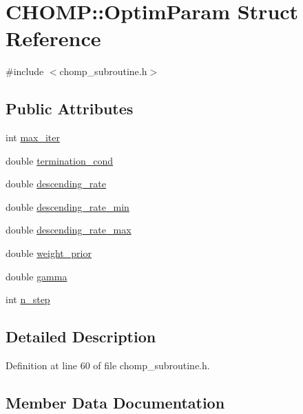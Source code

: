 \hypertarget{struct_c_h_o_m_p_1_1_optim_param}{}\section{C\+H\+O\+MP\+:\+:Optim\+Param Struct Reference}
\label{struct_c_h_o_m_p_1_1_optim_param}


{\ttfamily \#include $<$chomp\+\_\+subroutine.\+h$>$}

\subsection*{Public Attributes}
\begin{DoxyCompactItemize}
\item 
int \hyperlink{struct_c_h_o_m_p_1_1_optim_param_a0ede8f165be67dd3607e47fa90ed9c31}{max\+\_\+iter}
\item 
double \hyperlink{struct_c_h_o_m_p_1_1_optim_param_afb3b23647f1698f1815f4f877ac302ea}{termination\+\_\+cond}
\item 
double \hyperlink{struct_c_h_o_m_p_1_1_optim_param_a24f769bd28ca6ecceadb0b88a6e5c8fa}{descending\+\_\+rate}
\item 
double \hyperlink{struct_c_h_o_m_p_1_1_optim_param_a2d508c9266b950e05f908b8445dc95ee}{descending\+\_\+rate\+\_\+min}
\item 
double \hyperlink{struct_c_h_o_m_p_1_1_optim_param_a3ad3b5a547e99a6073c7ab0a40e04ab3}{descending\+\_\+rate\+\_\+max}
\item 
double \hyperlink{struct_c_h_o_m_p_1_1_optim_param_a7dc4e45cd704217867a399e656af6b87}{weight\+\_\+prior}
\item 
double \hyperlink{struct_c_h_o_m_p_1_1_optim_param_a08dbedf3d695dd849e99972eeda4854a}{gamma}
\item 
int \hyperlink{struct_c_h_o_m_p_1_1_optim_param_ac6dafdf330d8f879009f461a77b41c63}{n\+\_\+step}
\end{DoxyCompactItemize}


\subsection{Detailed Description}


Definition at line 60 of file chomp\+\_\+subroutine.\+h.



\subsection{Member Data Documentation}
